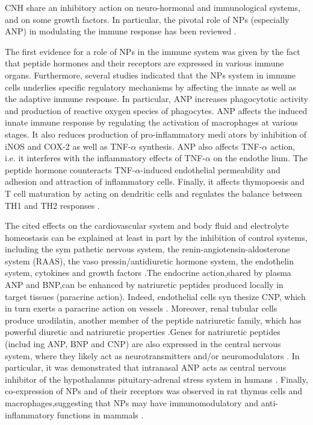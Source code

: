 \documentclass[14pt,a4paper,onecolumn]{extarticle}
\begin{document}
CNH share an inhibitory action on neuro-hormonal and immunological systems, and on some growth factors. In particular, the pivotal role of NPs (especially ANP) in modulating the immune response has been reviewed \citep{98}.

The first evidence for a role of NPs in the immune system was given by the fact that peptide hormones and their receptors are expressed in various immune organs. Furthermore, several studies indicated that the NPs system in immune cells underlies specific regulatory mechanisms by affecting the innate as well as the adaptive immune response. In particular, ANP increases phagocytotic activity and production of reactive oxygen species of phagocytes. ANP affects the induced innate immune response by regulating the activation of macrophages at various stages. It also reduces production of pro-inflammatory medi ators by inhibition of iNOS and COX-2 as well as TNF-$\alpha$ synthesis. ANP also affects TNF-$\alpha$ action, i.e. it interferes with the inflammatory effects of TNF-$\alpha$ on the endothe lium. The peptide hormone counteracts TNF-$\alpha$-induced endothelial permeability and adhesion and attraction of inflammatory cells. Finally, it affects thymopoesis and T cell maturation by acting on dendritic cells and regulates the balance between TH1 and TH2 responses \citep{99}.



The cited effects on the cardiovascular system and body fluid and electrolyte homeostasis can be explained at least in part by the inhibition of control systems, including the sym pathetic nervous system, the renin-angiotensin-aldosterone system (RAAS), the vaso pressin/antidiuretic hormone system, the endothelin system, cytokines and growth factors \citep{90} \citep{96} \citep{97} \citep{98} \citep{99}.The endocrine action,shared by plasma ANP and BNP,can be enhanced by natriuretic peptides produced locally in target tissues (paracrine action). Indeed, endothelial cells syn thesize CNP, which in turn exerts a paracrine action on vessels \citep{86} \citep{87} \citep{88}. Moreover, renal tubular cells produce urodilatin, another member of the peptide natriuretic family, which has powerful diuretic and natriuretic properties \citep{100}.Genes for natriuretic peptides (includ ing ANP, BNP and CNP) are also expressed in the central nervous system, where they likely act as neurotransmitters and/or neuromodulators \citep{93} \citep{100}. In particular, it was demonstrated that intranasal ANP acts as central nervous inhibitor of the hypothalamus pituitary-adrenal stress system in humans \citep{103}. Finally, co-expression of NPs and of their receptors was observed in rat thymus cells and macrophages,suggesting that NPs may have immunomodulatory and anti-inflammatory functions in mammals \citep{106}.
\end{document}
